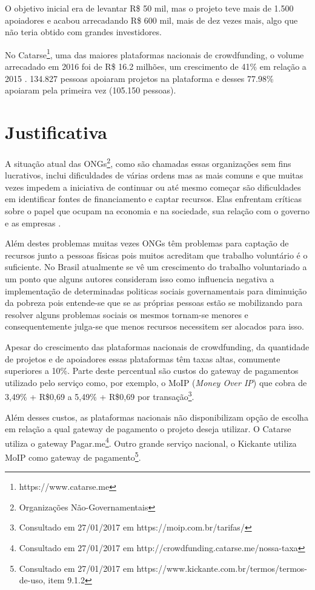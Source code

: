 O objetivo inicial era de levantar R\$ 50 mil, mas o projeto teve mais de 1.500 apoiadores e acabou arrecadando R\$ 600 mil, mais de dez vezes mais, algo que não teria obtido com grandes investidores.

No Catarse\footnote{https://www.catarse.me}, uma das maiores plataformas nacionais de crowdfunding, o volume arrecadado em 2016 foi de R\$ 16.2 milhões, um crescimento de 41\% em relação a 2015 \cite{catarse-retrospectiva2016}. 134.827 pessoas apoiaram projetos na plataforma e desses 77.98\% apoiaram pela primeira vez (105.150 pessoas).



\section{Justificativa}
A situação atual das ONGs\footnote{Organizações Não-Governamentais}, como são chamadas essas organizações sem fins lucrativos, inclui dificuldades de várias ordens mas as mais comuns e que muitas vezes impedem a iniciativa de continuar ou até mesmo começar são dificuldades em identificar fontes de financiamento e captar recursos. Elas enfrentam críticas sobre o papel que ocupam na economia e na sociedade, sua relação com o governo e as empresas \cite{GOUVEIA2007}.

Além destes problemas muitas vezes ONGs têm problemas para captação de recursos junto a pessoas físicas pois muitos acreditam que trabalho voluntário é o suficiente. No Brasil atualmente se vê um crescimento do trabalho voluntariado a um ponto que alguns autores \cite{fagundes2012repercussoes} consideram isso como influencia negativa a implementação de determinadas politicas sociais governamentais para diminuição da pobreza pois entende-se que se as próprias pessoas estão se mobilizando para resolver alguns problemas sociais os mesmos tornam-se menores e consequentemente julga-se que menos recursos necessitem ser alocados para isso.

Apesar do crescimento das plataformas nacionais de crowdfunding, da quantidade de projetos e de apoiadores essas plataformas têm taxas altas, comumente superiores a 10\%. Parte deste percentual são custos do gateway de pagamentos utilizado pelo serviço como, por exemplo, o MoIP (\emph{Money Over IP}) que cobra de 3,49\% + R\$0,69 a 5,49\% + R\$0,69 por transação\footnote{Consultado em 27/01/2017 em https://moip.com.br/tarifas/}.

Além desses custos, as plataformas nacionais não disponibilizam opção de escolha em relação a qual gateway de pagamento o projeto deseja utilizar. O Catarse utiliza o gateway Pagar.me\footnote{Consultado em 27/01/2017 em http://crowdfunding.catarse.me/nossa-taxa}. Outro grande serviço nacional, o Kickante utiliza MoIP como gateway de pagamento\footnote{Consultado em 27/01/2017 em https://www.kickante.com.br/termos/termos-de-uso, item 9.1.2}.

